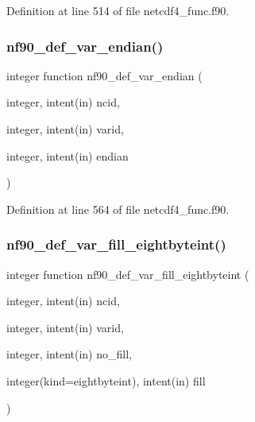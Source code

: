 Definition at line 514 of file netcdf4\+\_\+func.\+f90.

\mbox{\label{netcdf4__func_8f90_adb284c018687dc0eafb13f4ffc1caba9}} 
\subsubsection{\texorpdfstring{nf90\+\_\+def\+\_\+var\+\_\+endian()}{nf90\_def\_var\_endian()}}
{\footnotesize\ttfamily integer function nf90\+\_\+def\+\_\+var\+\_\+endian (\begin{DoxyParamCaption}\item[{integer, intent(in)}]{ncid,  }\item[{integer, intent(in)}]{varid,  }\item[{integer, intent(in)}]{endian }\end{DoxyParamCaption})}



Definition at line 564 of file netcdf4\+\_\+func.\+f90.

\mbox{\label{netcdf4__func_8f90_ac21f174cc8607071ffb854c2920894a6}} 
\subsubsection{\texorpdfstring{nf90\+\_\+def\+\_\+var\+\_\+fill\+\_\+eightbyteint()}{nf90\_def\_var\_fill\_eightbyteint()}}
{\footnotesize\ttfamily integer function nf90\+\_\+def\+\_\+var\+\_\+fill\+\_\+eightbyteint (\begin{DoxyParamCaption}\item[{integer, intent(in)}]{ncid,  }\item[{integer, intent(in)}]{varid,  }\item[{integer, intent(in)}]{no\+\_\+fill,  }\item[{integer(kind=eightbyteint), intent(in)}]{fill }\end{DoxyParamCaption})}



